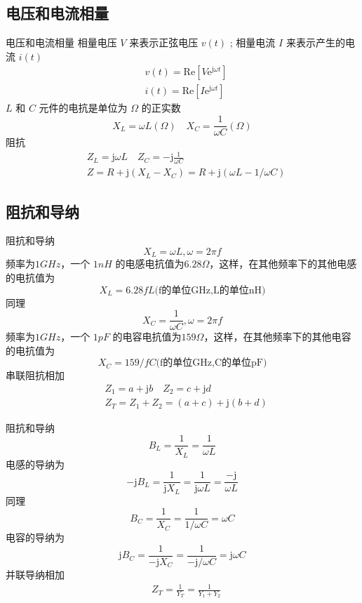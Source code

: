 \subsection{电压和电流相量}
\begin{frame}{电压和电流相量}
    相量电压 $V$ 来表示正弦电压 $v(t)$ ; 相量电流 $I$ 来表示产生的电流 $i(t)$
    \begin{align*}
         & v(t)=\mathrm{Re}[V\mathrm{e}^{\mathrm{j}\omega t}] \\
         & i(t)=\mathrm{Re}[I\mathrm{e}^{\mathrm{j}\omega t}]
    \end{align*}
    $L$ 和 $C$ 元件的电抗是单位为 $\Omega$ 的正实数
    $$X_L = \omega L(\Omega) \quad X_C = \frac{1}{\omega C}(\Omega)$$
    阻抗
    \begin{align*}
        & Z_L=\mathrm{j} \omega L \quad Z_C=-\mathrm{j} \frac{1}{\omega C} \\
        & Z=R+\mathrm{j} (X_L-X_C)=R+\mathrm{j} (\omega L-1/\omega C)
   \end{align*}
\end{frame}

\subsection{阻抗和导纳}
\begin{frame}{阻抗和导纳}
$$X_L=\omega L, \omega=2\pi f$$
频率为$1GHz$，一个 $1nH$ 的电感电抗值为$6.28\Omega$，这样，在其他频率下的其他电感的电抗值为
$$X_L=6.28fL\text{(f的单位GHz,L的单位nH)}$$
同理
$$X_C=\frac{1}{\omega C}, \omega=2\pi f$$
频率为$1GHz$，一个 $1pF$ 的电容电抗值为$159\Omega$，这样，在其他频率下的其他电容的电抗值为
$$X_C=159/fC\text{(f的单位GHz,C的单位pF)}$$
串联阻抗相加
\begin{align*}
    &Z_1=a+\mathrm{j} b \quad Z_2=c+\mathrm{j} d\\
    &Z_T=Z_1+Z_2=(a+c)+\mathrm{j} (b+d)
\end{align*}
\end{frame}

\begin{frame}{阻抗和导纳}
    $$B_L=\frac{1}{X_L}=\frac{1}{\omega L}$$
    电感的导纳为
    $$-\mathrm{j} B_L=\frac{1}{\mathrm{j} X_L}=\frac{1}{\mathrm{j} \omega L}=\frac{-\mathrm{j} }{\omega L}$$
    同理
    $$B_C=\frac{1}{X_C}=\frac{1}{1/\omega C}=\omega C$$
    电容的导纳为
    $$\mathrm{j} B_C=\frac{1}{-\mathrm{j} X_C}=\frac{1}{-\mathrm{j} /\omega C}=\mathrm{j} \omega C$$
    并联导纳相加
    \begin{align*}
        &Z_T=\frac{1}{Y_T}=\frac{1}{Y_1+Y_2}
    \end{align*}
    \end{frame}

